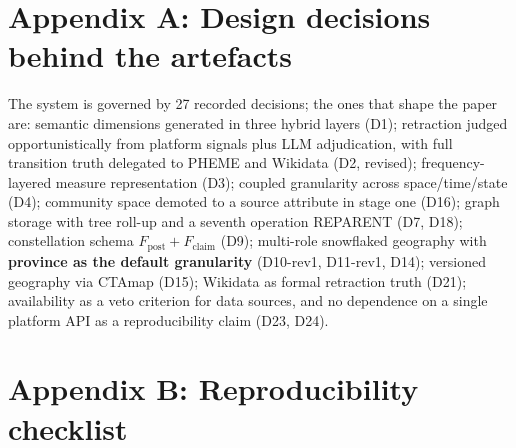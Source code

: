 
\section*{Appendix A: Design decisions behind the artefacts}

The system is governed by 27 recorded decisions; the ones that shape the paper are: semantic dimensions generated in three hybrid layers (D1); retraction judged opportunistically from platform signals plus LLM adjudication, with full transition truth delegated to PHEME and Wikidata (D2, revised); frequency-layered measure representation (D3); coupled granularity across space/time/state (D4); community space demoted to a source attribute in stage one (D16); graph storage with tree roll-up and a seventh operation REPARENT (D7, D18); constellation schema $F_{\text{post}}+F_{\text{claim}}$ (D9); multi-role snowflaked geography with \textbf{province as the default granularity} (D10-rev1, D11-rev1, D14); versioned geography via CTAmap (D15); Wikidata as formal retraction truth (D21); availability as a veto criterion for data sources, and no dependence on a single platform API as a reproducibility claim (D23, D24).

\section*{Appendix B: Reproducibility checklist}


